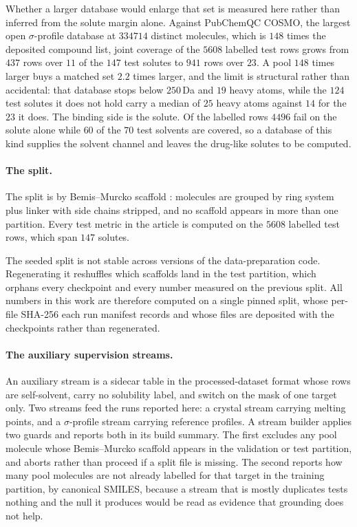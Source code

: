 Whether a larger database would enlarge that set is measured here rather than inferred from the
solute margin alone. Against PubChemQC COSMO, the largest open $\sigma$-profile database at
$334714$ distinct molecules, which is $148$ times the deposited compound list, joint coverage of
the $5608$ labelled test rows grows from $437$ rows over $11$ of the $147$ test solutes to $941$
rows over $23$. A pool $148$ times larger buys a matched set $2.2$ times larger, and the limit is
structural rather than accidental: that database stops below $250$\,Da and $19$ heavy atoms, while
the $124$ test solutes it does not hold carry a median of $25$ heavy atoms against $14$ for the
$23$ it does. The binding side is the solute. Of the labelled rows $4496$ fail on the solute alone
while $60$ of the $70$ test solvents are covered, so a database of this kind supplies the solvent
channel and leaves the drug-like solutes to be computed.

\paragraph{The split.}
The split is by Bemis--Murcko scaffold \cite{bemis1996}: molecules are grouped by ring system plus
linker with side chains stripped, and no scaffold appears in more than one partition. Every test
metric in the article is computed on the $5608$ labelled test rows, which span $147$ solutes.

The seeded split is not stable across versions of the data-preparation code. Regenerating it
reshuffles which scaffolds land in the test partition, which orphans every checkpoint and every
number measured on the previous split. All numbers in this work are therefore computed on a single
pinned split, whose per-file SHA-256 each run manifest records and whose files are deposited with
the checkpoints rather than regenerated.

\paragraph{The auxiliary supervision streams.}
An auxiliary stream is a sidecar table in the processed-dataset format whose rows are
self-solvent, carry no solubility label, and switch on the mask of one target only. Two streams
feed the runs reported here: a crystal stream carrying melting points, and a $\sigma$-profile
stream carrying reference profiles. A stream builder applies two guards and reports both in its
build summary. The first excludes any pool molecule whose Bemis--Murcko scaffold appears in the
validation or test partition, and aborts rather than proceed if a split file is missing. The second
reports how many pool molecules are not already labelled for that target in the training partition,
by canonical SMILES, because a stream that is mostly duplicates tests nothing and the null it
produces would be read as evidence that grounding does not help.

